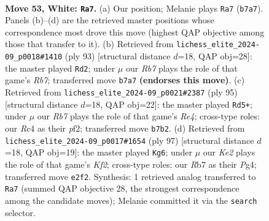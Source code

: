 \documentclass[11pt]{article}
\begin{document}
\clearpage

\begin{figure}[p]\centering
\begin{subfigure}{0.46\textwidth}\centering
\resizebox{\linewidth}{!}{%
\newchessgame
\chessboard[
  setfen={8/1R3p2/4pk2/p7/P1R1P3/5P1P/4K3/7r w - - 2 53},
  showmover=false,
  pgfstyle=straightmove, color=movearrow, markmove={b7-a7}
]}
\caption{}
\end{subfigure}\hfill
\begin{subfigure}{0.46\textwidth}\centering
\resizebox{\linewidth}{!}{%
\newchessgame
\chessboard[
  setfen={8/8/3r1k2/2R2pp1/3p4/3P1KP1/1r3P2/8 b - - 3 47},
  showmover=false,
  pgfstyle=straightmove, color=movearrow, markmove={b2-d2}
]}
\caption{}
\end{subfigure}
\\[4pt]
\begin{subfigure}{0.46\textwidth}\centering
\resizebox{\linewidth}{!}{%
\newchessgame
\chessboard[
  setfen={5k2/1R6/4p3/1p2r3/2p3p1/2P3P1/1P1K1P2/8 b - - 11 48},
  showmover=false,
  pgfstyle=straightmove, color=movearrow, markmove={e5-d5}
]}
\caption{}
\end{subfigure}\hfill
\begin{subfigure}{0.46\textwidth}\centering
\resizebox{\linewidth}{!}{%
\newchessgame
\chessboard[
  setfen={R7/5k1p/p3rp2/P7/6pP/6P1/5P2/6K1 b - - 1 49},
  showmover=false,
  pgfstyle=straightmove, color=movearrow, markmove={f7-g6}
]}
\caption{}
\end{subfigure}
\caption{\textbf{Move 53, White: \texttt{Ra7}.} (a) Our position; Melanie plays \texttt{Ra7} (\texttt{b7a7}). Panels (b)--(d) are the retrieved master positions whose correspondence most drove this move (highest QAP objective among those that transfer to it). (b) Retrieved from \texttt{lichess\_elite\_2024-09\_p0018\#1410} (ply 93) [structural distance $d$=18, QAP obj=28]: the master played \texttt{Rd2}; under $\mu$ our \emph{Rb7} plays the role of that game's \emph{Rb7}; transferred move \texttt{b7a7} \textbf{(endorses this move)}. (c) Retrieved from \texttt{lichess\_elite\_2024-09\_p0021\#2387} (ply 95) [structural distance $d$=18, QAP obj=22]: the master played \texttt{Rd5+}; under $\mu$ our \emph{Rb7} plays the role of that game's \emph{Re4}; cross-type roles: our \emph{R}c4 as their \emph{p}f2; transferred move \texttt{b7b2}. (d) Retrieved from \texttt{lichess\_elite\_2024-09\_p0017\#1654} (ply 97) [structural distance $d$=18, QAP obj=19]: the master played \texttt{Kg6}; under $\mu$ our \emph{Ke2} plays the role of that game's \emph{Kf2}; cross-type roles: our \emph{R}b7 as their \emph{P}g4; transferred move \texttt{e2f2}. Synthesis: 1 retrieved analog transferred to \texttt{Ra7} (summed QAP objective 28, the strongest correspondence among the candidate moves); Melanie committed it via the \texttt{search} selector.}
\label{fig:thought-m104}
\end{figure}
\end{document}
